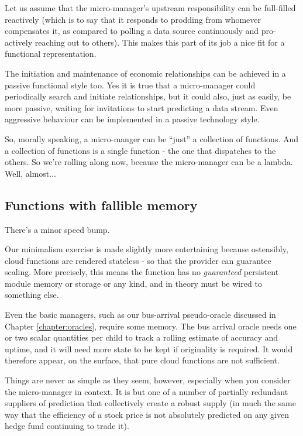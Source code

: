 Let us assume that the micro-manager's upstream responsibility can be full-filled reactively (which is to say that it responds to prodding from whomever compensates it, as compared to polling a data source continuously and pro-actively reaching out to others). This makes this part of its job a nice fit for a functional representation.  

The initiation and maintenance of economic relationships can be achieved in a passive functional style too. Yes it is true that a micro-manager could periodically search and initiate relationships, but it could also, just as easily, be more passive, waiting for invitations to start predicting a data stream. Even aggressive behaviour can be implemented in a passive technology style. 

So, morally speaking, a micro-manger can be ``just'' a collection of functions. And a collection of functions is a single function - the one that dispatches to the others. So we're rolling along now, because the micro-manager can be a lambda. Well, almost...


\subsection{Functions with fallible memory}

There's a minor speed bump. 

Our minimalism exercise is made slightly more entertaining because ostensibly, cloud functions are rendered stateless - so that the provider can guarantee scaling. More precisely, this means the function has no {\em guaranteed} persistent module memory or storage or any kind, and in theory must be wired to something else.   


Even the basic managers, such as our bus-arrival pseudo-oracle discussed in Chapter \ref{chapter:oracles}, require some memory. The bus arrival oracle needs one or two scalar quantities per child to track a rolling estimate of accuracy and uptime, and it will need more state to be kept if originality is required. It would therefore appear, on the surface, that pure cloud functions are not sufficient. 


Things are never as simple as they seem, however, especially when you consider the micro-manager in context. It is but one of a number of partially redundant suppliers of prediction that collectively create a robust supply (in much the same way that the efficiency of a stock price is not absolutely predicted on any given hedge fund continuing to trade it). 


